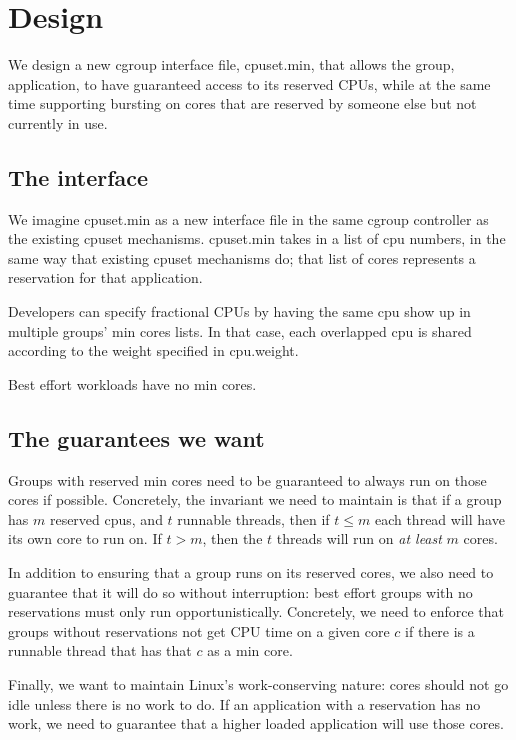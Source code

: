 \section{Design}\label{s:design}

We design a new cgroup interface file, cpuset.min, that allows the group, \ie{}
application, to have guaranteed access to its reserved CPUs, while at the same
time supporting bursting on cores that are reserved by someone else but not
currently in use.

\subsection{The interface}

We imagine cpuset.min as a new interface file in the same cgroup controller as
the existing \cgroups{} cpuset mechanisms. cpuset.min takes in a list of cpu
numbers, in the same way that existing cpuset mechanisms do; that list of cores
represents a reservation for that application. 

Developers can specify fractional CPUs by having the same cpu show up in
multiple groups' min cores lists. In that case, each overlapped cpu is shared
according to the weight specified in cpu.weight.

Best effort workloads have no min cores.

\subsection{The guarantees we want}

Groups with reserved min cores need to be guaranteed to always run on those
cores if possible. Concretely, the invariant we need to maintain is that if a
group has $m$ reserved cpus, and $t$ runnable threads, then if $t \leq m$ each
thread will have its own core to run on. If $t > m$, then the $t$ threads will
run on \textit{at least} $m$ cores.

In addition to ensuring that a group runs on its reserved cores, we also need to
guarantee that it will do so without interruption: best effort groups with no
reservations must only run opportunistically. Concretely, we need to enforce
that groups without reservations not get CPU time on a given core $c$ if there
is a runnable thread that has that $c$ as a min core.

Finally, we want to maintain Linux's work-conserving nature: cores should not go
idle unless there is no work to do. If an application with a reservation has no
work, we need to guarantee that a higher loaded application will use those
cores.

